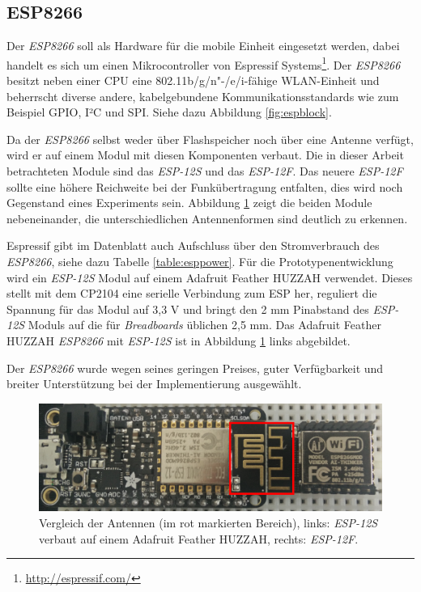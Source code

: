 \subsection{ESP8266}
Der \emph{ESP8266} soll als Hardware für die mobile Einheit eingesetzt werden, dabei handelt es sich um einen Mikrocontroller von Espressif Systems\footnote{\url{http://espressif.com/}}.
Der \emph{ESP8266} besitzt neben einer CPU eine 802.11b/g/n"-/e/i-fähige WLAN-Einheit und beherrscht diverse andere, kabelgebundene Kommunikationsstandards wie zum Beispiel GPIO, I²C und SPI. 
Siehe dazu Abbildung \ref{fig:espblock}. 

Da der \emph{ESP8266} selbst weder über Flashspeicher noch über eine Antenne verfügt, wird er auf einem Modul mit diesen Komponenten verbaut. 
Die in dieser Arbeit betrachteten Module sind das \emph{ESP-12S} und das \emph{ESP-12F}.
Das neuere \emph{ESP-12F} sollte eine höhere Reichweite bei der Funkübertragung entfalten, dies wird noch Gegenstand eines Experiments sein.
Abbildung \ref{fig:espmodules} zeigt die beiden Module nebeneinander, die unterschiedlichen Antennenformen sind deutlich zu erkennen.

Espressif gibt im Datenblatt auch Aufschluss über den Stromverbrauch des \emph{ESP8266}, siehe dazu Tabelle \ref{table:esppower}.
Für die Prototypenentwicklung wird ein \emph{ESP-12S} Modul auf einem Adafruit Feather HUZZAH verwendet. 
Dieses stellt mit dem CP2104 eine serielle Verbindung zum ESP her, reguliert die Spannung für das Modul auf 3,3 V und bringt den 2 mm Pinabstand des \emph{ESP-12S} Moduls auf die für \emph{Breadboards} üblichen 2,5 mm.
Das Adafruit Feather HUZZAH \emph{ESP8266} mit \emph{ESP-12S} ist in Abbildung \ref{fig:espmodules} links abgebildet.

Der \emph{ESP8266} wurde wegen seines geringen Preises, guter Verfügbarkeit und breiter Unterstützung bei der Implementierung ausgewählt.

\begin{figure}[h]
  \centering
	\includegraphics[width=\textwidth]{images/espmodules.png}
  \caption{Vergleich der Antennen (im rot markierten Bereich), links: \emph{ESP-12S} verbaut auf einem Adafruit Feather HUZZAH, rechts: \emph{ESP-12F}.}
  \label{fig:espmodules}
\end{figure}


